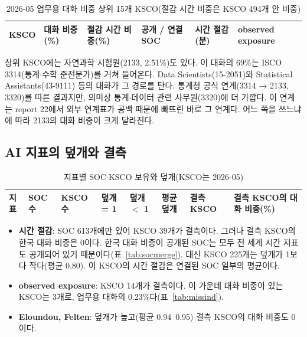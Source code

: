 \documentclass[11pt]{article}
\begin{document}
\begin{longtable}{L{6.4cm}R{1.6cm}R{1.8cm}R{1.8cm}R{1.8cm}R{2.2cm}}
\caption{2026-05 업무용 대화 비중 상위 15개 KSCO(절감 시간 비중은 KSCO 494개 안 비중)}\label{tab:top}\\
\toprule
KSCO & 대화 비중(\%) & 절감 시간 비중(\%) & 공개 / 연결 SOC & 시간 절감(분) & observed exposure \\
\midrule

\bottomrule
\end{longtable}

\noindent 상위 KSCO에는 자연과학 시험원(2133, 2.51\%)도 있다. 이 대화의 69\%는 ISCO 3314(통계$\cdot$수학 준전문가)를 거쳐 들어온다. Data Scientists(15-2051)와 Statistical Assistants(43-9111) 등의 대화가 그 경로를 탄다. 통계청 공식 연계(3314 → 2133, 3320)를 따른 결과지만, 의미상 통계$\cdot$데이터 관련 사무원(3320)에 더 가깝다. 이 연계는 report 22에서 외부 연계표가 공백 때문에 빠뜨린 바로 그 연계다. 어느 쪽을 쓰느냐에 따라 2133의 대화 비중이 크게 달라진다.

\subsection{AI 지표의 덮개와 결측}

\begin{longtable}{L{3.6cm}R{1.4cm}R{1.4cm}R{1.6cm}R{1.6cm}R{1.6cm}R{1.4cm}R{2.4cm}}
\caption{지표별 SOC$\cdot$KSCO 보유와 덮개(KSCO는 2026-05)}\label{tab:indcov}\\
\toprule
지표 & SOC 수 & KSCO 수 & 덮개 = 1 & 덮개 $<$ 1 & 평균 덮개 & 결측 KSCO & 결측 KSCO의 대화 비중(\%) \\
\midrule

\bottomrule
\end{longtable}

\begin{itemize}[leftmargin=*]
  \item \textbf{시간 절감}: SOC 613개에만 있어 KSCO 39개가 결측이다. 그러나 결측 KSCO의 한국 대화 비중은 0이다. 한국 대화 비중이 공개된 SOC는 모두 전 세계 시간 지표도 공개되어 있기 때문이다(표~\ref{tab:socmerge}). 대신 KSCO 225개는 덮개가 1보다 작다(평균 0.80). 이 KSCO의 시간 절감은 연결된 SOC 일부의 평균이다.
  \item \textbf{observed exposure}: KSCO 14개가 결측이다. 이 가운데 대화 비중이 있는 KSCO는 3개로, 업무용 대화의 0.23\%다(표~\ref{tab:missind}).
  \item \textbf{Eloundou, Felten}: 덮개가 높고(평균 0.94~0.95) 결측 KSCO의 대화 비중도 0이다.
\end{itemize}
\end{document}
